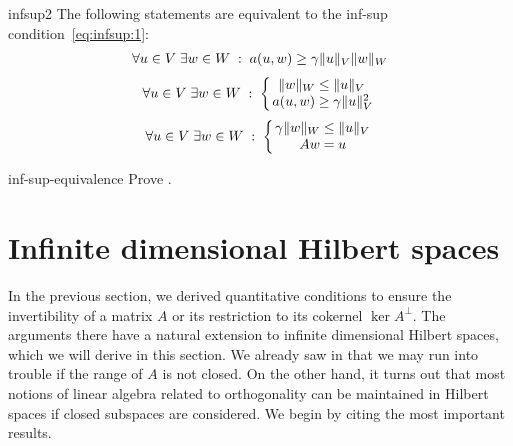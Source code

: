 \begin{Lemma}{infsup2}
  The following statements are equivalent to the inf-sup
  condition~\eqref{eq:infsup:1}:
  \begin{gather}
    \label{eq:infsup:2}
    \forall u\in V \;\exists w\in W \;:\; a(u,w) \ge \gamma \lVert u\rVert_V\lVert w\rVert_W
  \end{gather}
  \begin{gather}
    \label{eq:infsup:3}
    \forall u\in V
    \;\exists w\in W \;:\;
    \left\{
    \arraycolsep0.3ex
    \begin{array}{rcl}
      \norm{w}_W &\le&\norm{u}_V\\
      a(u,w) &\ge& \gamma \norm{u}_V^2
    \end{array}
    \right.
  \end{gather}
  \begin{gather}
    \label{eq:infsup:3a}
    \forall u\in V
    \;\exists w\in W \;:\;
    \left\{
    \arraycolsep0.3ex
    \begin{array}{rcl}
      \gamma \norm{w}_W &\le&\norm{u}_V\\
      Aw &=& u
    \end{array}
    \right.
  \end{gather}
\end{Lemma}

\begin{Problem}{inf-sup-equivalence}
  Prove .
\end{Problem}


\section{Infinite dimensional Hilbert spaces}

\begin{intro}
  In the previous section, we derived quantitative conditions to
  ensure the invertibility of a matrix $A$ or its restriction to its
  cokernel $\ker A^\perp$. The arguments there have a natural
  extension to infinite dimensional Hilbert spaces, which we will
  derive in this section. We already saw in
   that we may run into trouble
  if the range of $A$ is not closed. On the other hand, it turns out
  that most notions of linear algebra related to orthogonality can be
  maintained in Hilbert spaces if closed subspaces are considered.
  We begin by citing the most important results.
\end{intro}

